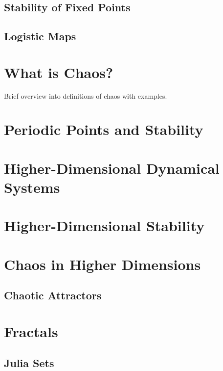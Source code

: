 \documentclass[11pt]{article}
\theoremstyle{definition}
\begin{document}
\subsection{Stability of Fixed Points}
\subsection{Logistic Maps}
\section{What is Chaos?}
\cite{sparrow2012lorenz}
Brief overview into definitions of chaos with examples.
\section{Periodic Points and Stability}
\section{Higher-Dimensional Dynamical Systems}
\section{Higher-Dimensional Stability}
\section{Chaos in Higher Dimensions}
\subsection{Chaotic Attractors}
\section{Fractals}
\subsection{Julia Sets}



\end{document}
